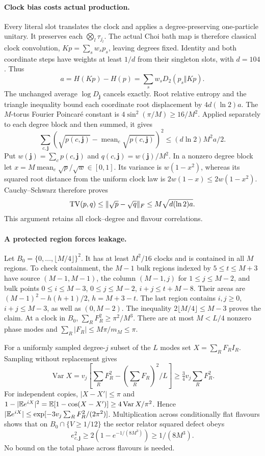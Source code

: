 \paragraph{Clock bias costs actual production.}
Every literal slot translates the clock and applies a degree-preserving
one-particle unitary. It preserves each $\bigotimes_l\tau_{j_l}$.
The actual Choi bath map is therefore classical clock convolution,
$Kp=\sum_s w_sp_s$, leaving degrees fixed. Identity and both
coordinate steps have weights at least $1/d$ from their singleton
slots, with $d=104$. Thus
\[
 a=H(Kp)-H(p)=\sum_s w_sD_2(p_s\Vert Kp).
\]
The unchanged average $\log D_{\mathbf j}$ cancels exactly.
Root relative entropy and the triangle inequality bound each coordinate
root displacement by $4d(\ln2)a$. The $M$-torus Fourier Poincar\'e
constant is $4\sin^2(\pi/M)\geq16/M^2$. Applied separately to
each degree block and then summed, it gives
\[
 \sum_{c,\mathbf j}(\sqrt{p(c,\mathbf j)}
       -\operatorname{mean}_c\sqrt{p(c,\mathbf j)})^2
       \leq(d\ln2)M^2a/2.
\]
Put $w(\mathbf j)=\sum_cp(c,\mathbf j)$ and
$q(c,\mathbf j)=w(\mathbf j)/M^2$.
In a nonzero degree block let
$x=M\operatorname{mean}_c\sqrt p/\sqrt w\in[0,1]$.
Its variance is $w(1-x^2)$, whereas its squared root distance
from the uniform clock law is $2w(1-x)\leq2w(1-x^2)$.
Cauchy--Schwarz therefore proves
\begin{equation}\label{eq:joint-clock-degree}
 \operatorname{TV}(p,q)\leq
 \lVert \sqrt p-\sqrt q\rVert_F\leq M\sqrt{d(\ln2)a}.
\end{equation}
This argument retains all clock--degree and flavour correlations.

\paragraph{A protected region forces leakage.}
Let $B_0=\{0,\ldots,\lfloor M/4\rfloor\}^2$.
It has at least $M^2/16$ clocks and is contained in all $M$ regions.
To check containment, the $M-1$ bulk regions indexed by
$5\leq t\leq M+3$ have source $(M-1,M-1)$, the column
$(M-1,j)$ for $1\leq j\leq M-2$, and bulk points
$0\leq i\leq M-3$, $0\leq j\leq M-2$, $i+j\leq t+M-8$.
Their areas are $(M-1)^2-h(h+1)/2$, $h=M+3-t$.
The last region contains $i,j\geq0$, $i+j\leq M-3$, as well as
$(0,M-2)$. The inequality $2\lfloor M/4\rfloor\leq M-3$
proves the claim. At a clock in $B_0$,
$\sum_RF_R^2\geq\pi^2/M^3$.
There are at most $M<L/4$ nonzero phase modes and
$\sum_R|F_R|\leq M\pi/m_M\leq\pi$.

For a uniformly sampled degree-$j$ subset of the $L$ modes set
$X=\sum_RF_RI_R$. Sampling without replacement gives
\[
 \operatorname{Var}X=v_j\left[\sum_RF_R^2-
             (\sum_RF_R)^2/L\right]\geq\tfrac34v_j\sum_RF_R^2.
\]
For independent copies, $|X-X'|\leq\pi$ and
$1-|\mathbb E e^{iX}|^2=\mathbb E[1-\cos(X-X')]
\geq4\operatorname{Var}X/\pi^2$.
Hence $|\mathbb E e^{iX}|\leq
\exp[-3v_j\sum_RF_R^2/(2\pi^2)]$.
Multiplication across conditionally flat flavours shows that on
$B_0\cap\{V\geq1/12\}$ the sector relator squared defect obeys
\[
 e_{c,\mathbf j}^2\geq2(1-e^{-1/(8M^3)})\geq1/(8M^3).
\]
No bound on the total phase across flavours is needed.

